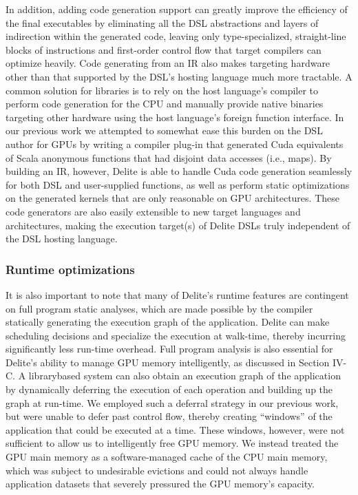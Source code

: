 In addition, adding code generation support can greatly
improve the efficiency of the final executables by eliminating
all the DSL abstractions and layers of indirection within the
generated code, leaving only type-specialized, straight-line
blocks of instructions and first-order control flow that target
compilers can optimize heavily. Code generating from an IR
also makes targeting hardware other than that supported by
the DSL’s hosting language much more tractable. A common
solution for libraries is to rely on the host language’s compiler to perform code generation for the CPU and manually
provide native binaries targeting other hardware using the host
language’s foreign function interface. In our previous work we
attempted to somewhat ease this burden on the DSL author
for GPUs by writing a compiler plug-in that generated Cuda
equivalents of Scala anonymous functions that had disjoint
data accesses (i.e., maps). By building an IR, however, Delite
is able to handle Cuda code generation seamlessly for both
DSL and user-supplied functions, as well as perform static
optimizations on the generated kernels that are only reasonable
on GPU architectures. These code generators are also easily
extensible to new target languages and architectures, making
the execution target(s) of Delite DSLs truly independent of the
DSL hosting language.


\subsubsection{Runtime optimizations}

It is also important to note that many of Delite’s runtime
features are contingent on full program static analyses, which
are made possible by the compiler statically generating the
execution graph of the application. Delite can make scheduling
decisions and specialize the execution at walk-time, thereby
incurring significantly less run-time overhead. Full program
analysis is also essential for Delite’s ability to manage GPU
memory intelligently, as discussed in Section IV-C. 
A librarybased system can also obtain an execution graph of the
application by dynamically deferring the execution of each
operation and building up the graph at run-time. We employed
such a deferral strategy in our previous work, but were unable
to defer past control flow, thereby creating “windows” of the
application that could be executed at a time. These windows,
however, were not sufficient to allow us to intelligently free
GPU memory. We instead treated the GPU main memory as a
software-managed cache of the CPU main memory, which was
subject to undesirable evictions and could not always handle
application datasets that severely pressured the GPU memory’s
capacity.



